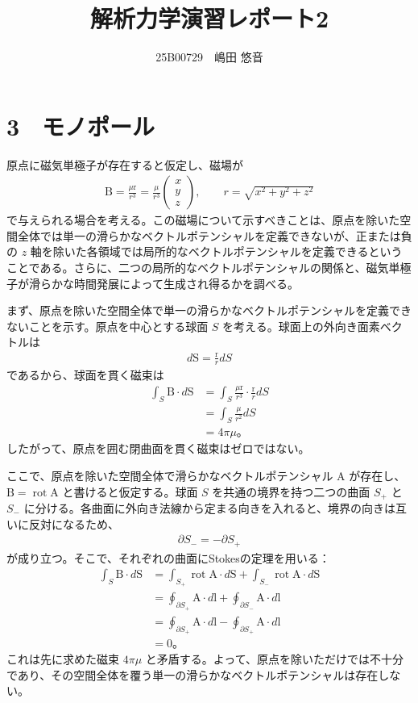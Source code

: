 \documentclass[platex,dvipdfmx,a4paper]{jsarticle}
\title{解析力学演習レポート2}
\author{25B00729　嶋田 悠音}
\newcommand{\vect}[1]{\boldsymbol{\mathrm{#1}}}
\begin{document}
\section*{3　モノポール}

原点に磁気単極子が存在すると仮定し、磁場が
\begin{align*}
  \vect{B}=\frac{\mu\vect{r}}{r^3}
  =\frac{\mu}{r^3}
  \begin{pmatrix}
    x\\
    y\\
    z
  \end{pmatrix},
  \qquad
  r=\sqrt{x^2+y^2+z^2}
\end{align*}
で与えられる場合を考える。この磁場について示すべきことは、原点を除いた空間全体では単一の滑らかなベクトルポテンシャルを定義できないが、正または負の \(z\) 軸を除いた各領域では局所的なベクトルポテンシャルを定義できるということである。さらに、二つの局所的なベクトルポテンシャルの関係と、磁気単極子が滑らかな時間発展によって生成され得るかを調べる。

まず、原点を除いた空間全体で単一の滑らかなベクトルポテンシャルを定義できないことを示す。原点を中心とする球面 \(S\) を考える。球面上の外向き面素ベクトルは
\begin{align*}
  d\vect{S}=\frac{\vect{r}}{r}dS
\end{align*}
であるから、球面を貫く磁束は
\begin{align*}
  \int_S\vect{B}\cdot d\vect{S}
  &=\int_S\frac{\mu\vect{r}}{r^3}\cdot\frac{\vect{r}}{r}dS\\
  &=\int_S\frac{\mu}{r^2}dS\\
  &=4\pi\mu。
\end{align*}
したがって、原点を囲む閉曲面を貫く磁束はゼロではない。

ここで、原点を除いた空間全体で滑らかなベクトルポテンシャル \(\vect{A}\) が存在し、\(\vect{B}=\operatorname{rot}\vect{A}\) と書けると仮定する。球面 \(S\) を共通の境界を持つ二つの曲面 \(S_+\) と \(S_-\) に分ける。各曲面に外向き法線から定まる向きを入れると、境界の向きは互いに反対になるため、
\begin{align*}
  \partial S_-=-\partial S_+
\end{align*}
が成り立つ。そこで、それぞれの曲面にStokesの定理を用いる：
\begin{align*}
  \int_S\vect{B}\cdot d\vect{S}
  &=\int_{S_+}\operatorname{rot}\vect{A}\cdot d\vect{S}
  +\int_{S_-}\operatorname{rot}\vect{A}\cdot d\vect{S}\\
  &=\oint_{\partial S_+}\vect{A}\cdot d\vect{l}
  +\oint_{\partial S_-}\vect{A}\cdot d\vect{l}\\
  &=\oint_{\partial S_+}\vect{A}\cdot d\vect{l}
  -\oint_{\partial S_+}\vect{A}\cdot d\vect{l}\\
  &=0。
\end{align*}
これは先に求めた磁束 \(4\pi\mu\) と矛盾する。よって、原点を除いただけでは不十分であり、その空間全体を覆う単一の滑らかなベクトルポテンシャルは存在しない。
\end{document}
